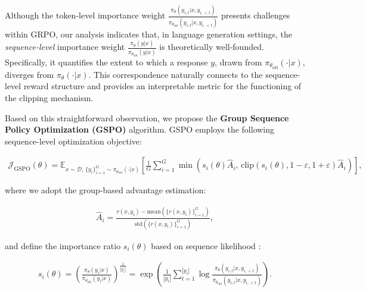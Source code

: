 Although the token-level importance weight $\frac{ \pi_{\theta} (y_{i,t} | x, y_{i,<t}) }{ \pi_{\theta_\text{old}} (y_{i,t} | x,y_{i,<t})}$ presents challenges within GRPO, our analysis indicates that, in language generation settings, the \textit{sequence-level} importance weight $\frac{ \pi_{\theta} (y | x) }{ \pi_{\theta_\text{old}} (y | x)}$ is theoretically well-founded. Specifically, it quantifies the extent to which a response $y$, drawn from $\pi_{\theta_\text{old}} (\cdot | x)$, diverges from $\pi_{\theta} (\cdot | x)$. This correspondence naturally connects to the sequence-level reward structure and provides an interpretable metric for the functioning of the clipping mechanism.

Based on this straightforward observation, we propose the \textbf{Group Sequence Policy Optimization (GSPO)} algorithm. GSPO employs the following sequence-level optimization objective:

\begin{align}
\mathcal{J}_\text{GSPO} (\theta) =
\mathbb{E}_{ x \sim \mathcal{D},\, \{y_i\}_{i=1}^G \sim \pi_{\theta_\text{old}}( \cdot | x) }
\left[ 
\frac{1}{G} \sum_{i=1}^{G}
\min \left( s_{i}(\theta)  \widehat{A}_{i},  \, \mathrm{clip} \left( s_{i}(\theta), 1 - {\varepsilon}, 1 + {\varepsilon} \right) \widehat{A}_{i} \right) 
\right],
\label{equ:gspo}
\end{align}

where we adopt the group-based advantage estimation:

\begin{align}
\widehat{A}_{i} = \frac{r(x, y_i) - \mathrm{mean} \left( \{ r(x, y_i) \}_{i=1}^G \right) }{ \mathrm{std} \left( \{ r(x, y_i) \}_{i=1}^G \right) },
\end{align}

and define the importance ratio $s_{i}(\theta)$ based on sequence likelihood \citep{click}:

\begin{align}
s_{i}(\theta) = \left( \frac{ \pi_{\theta} (y_i | x) }{ \pi_{\theta_\text{old}} (y_i | x)} \right)^{\frac{1}{|y_i|}}
=
\exp \left( \frac{1}{|y_i|} \sum_{t=1}^{|y_i|} \log \frac{ \pi_{\theta} (y_{i,t} | x, y_{i,<t}) }{ \pi_{\theta_\text{old}} (y_{i,t} | x,y_{i,<t})} \right).
\end{align}

